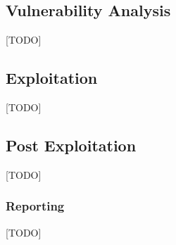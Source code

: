 \subsection{Vulnerability Analysis}
[TODO]

\subsection{Exploitation}
[TODO]

\subsection{Post Exploitation}
[TODO]

\subsubsection{Reporting}
[TODO]

